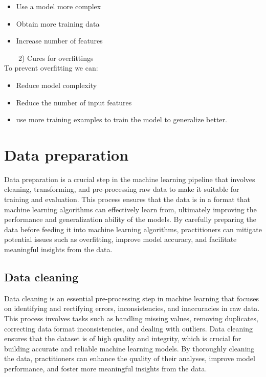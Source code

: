 \documentclass[
]{book}
\providecommand{\tightlist}{%
  \setlength{\itemsep}{0pt}\setlength{\parskip}{0pt}}
\begin{document}
\begin{itemize}
\tightlist
\item
  Use a model more complex
\item
  Obtain more training data
\item
  Increase number of features
\end{itemize}

~~~~2) Cures for overfittings\\
To prevent overfitting we can:

\begin{itemize}
\tightlist
\item
  Reduce model complexity
\item
  Reduce the number of input features
\item
  use more training examples to train the model to generalize better.
\end{itemize}

\hypertarget{data-preparation}{%
\chapter{Data preparation}\label{data-preparation}}

Data preparation is a crucial step in the machine learning pipeline that involves cleaning, transforming, and pre-processing raw data to make it suitable for training and evaluation. This process ensures that the data is in a format that machine learning algorithms can effectively learn from, ultimately improving the performance and generalization ability of the models. By carefully preparing the data before feeding it into machine learning algorithms, practitioners can mitigate potential issues such as overfitting, improve model accuracy, and facilitate meaningful insights from the data.

\hypertarget{data-cleaning-1}{%
\section{\texorpdfstring{Data cleaning\\
}{Data cleaning }}\label{data-cleaning-1}}

Data cleaning is an essential pre-processing step in machine learning that focuses on identifying and rectifying errors, inconsistencies, and inaccuracies in raw data. This process involves tasks such as handling missing values, removing duplicates, correcting data format inconsistencies, and dealing with outliers. Data cleaning ensures that the dataset is of high quality and integrity, which is crucial for building accurate and reliable machine learning models. By thoroughly cleaning the data, practitioners can enhance the quality of their analyses, improve model performance, and foster more meaningful insights from the data.
\end{document}
